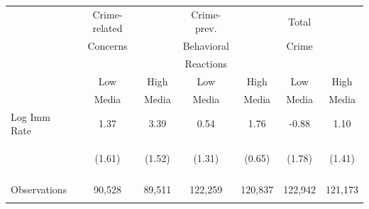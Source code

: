 \begin{center}
\begin{tabular}{lcccccc}
\hline \noalign{\smallskip} & Crime-related &  & Crime-prev. &  & Total & \\
 & Concerns &  & Behavioral &  & Crime & \\
 &  &  & Reactions &  &  & \\
 & Low & High & Low & High & Low & High\\
 & Media & Media & Media & Media & Media & Media\\
\noalign{\smallskip}\hline \noalign{\smallskip}Log Imm Rate & 1.37 & 3.39 & 0.54 & 1.76 & -0.88 & 1.10\\
 & \begin{footnotesize}(1.61)\end{footnotesize} & \begin{footnotesize}(1.52)\end{footnotesize} & \begin{footnotesize}(1.31)\end{footnotesize} & \begin{footnotesize}(0.65)\end{footnotesize} & \begin{footnotesize}(1.78)\end{footnotesize} & \begin{footnotesize}(1.41)\end{footnotesize}\\
 & \begin{footnotesize}[0.399]\end{footnotesize} & \begin{footnotesize}[0.031]\end{footnotesize} & \begin{footnotesize}[0.682]\end{footnotesize} & \begin{footnotesize}[0.009]\end{footnotesize} & \begin{footnotesize}[0.621]\end{footnotesize} & \begin{footnotesize}[0.438]\end{footnotesize}\\
\noalign{\smallskip}Observations & 90,528 & 89,511 & 122,259 & 120,837 & 122,942 & 121,173\\
 & \begin{footnotesize}\end{footnotesize} & \begin{footnotesize}\end{footnotesize} & \begin{footnotesize}\end{footnotesize} & \begin{footnotesize}\end{footnotesize} & \begin{footnotesize}\end{footnotesize} & \begin{footnotesize}\end{footnotesize}\\

\end{tabular}
\end{center}
